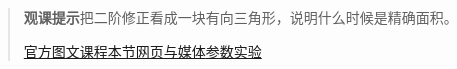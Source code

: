 \begin{quote}\small\textbf{观课提示}\quad 把二阶修正看成一块有向三角形，说明什么时候是精确面积。

\href{https://www.3blue1brown.com/lessons/taylor-series-geometric-view/}{官方图文课程}\quad\href{https://vitael04213.github.io/3blue1brown-notes/lessons/taylor-series-geometric-view.html}{本节网页与媒体}\quad\href{https://vitael04213.github.io/3blue1brown-notes/lab.html\#taylor}{参数实验}
\end{quote}
